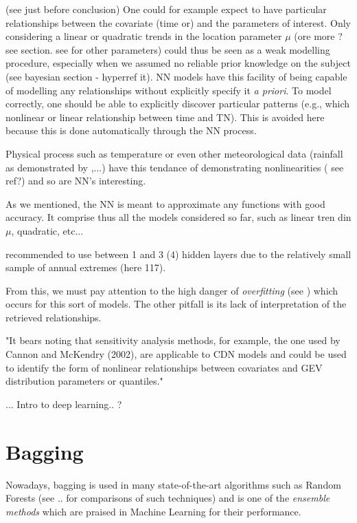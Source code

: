 \documentclass[11pt,a4paper,openany ]{book}
\begin{document}
(see \citet{cannon_flexible_2010} just before conclusion) 
One could for example expect to have particular relationships between the covariate (time or) and the parameters of interest. Only considering a linear or quadratic trends in the location parameter $\mu$ (ore more ? see section. see for other parameters) could thus be seen as a weak modelling procedure, especially when we assumed no reliable prior knowledge on the subject (see bayesian section - hyperref it).
NN models have this facility of being capable of modelling any relationships without explicitly specify it \emph{a priori}. To model correctly, one should be able to explicitly discover particular patterns (e.g., which nonlinear or linear relationship between time and TN). This is avoided here because this is done automatically through the NN process.

Physical process such as temperature or even other meteorological data (rainfall as demonstrated by \citet{cannon_flexible_2010},...) have this tendance of demonstrating nonlinearities ( see ref?) and so are NN's interesting.

As we mentioned, the NN is meant to approximate any functions with good accuracy. It comprise thus all the models considered so far, such as linear tren din $\mu$, quadratic, etc...

\citet{cannon_flexible_2010} recommended to use between 1 and 3 (4) hidden layers due to the relatively small sample of annual extremes (here 117).


 From this, we must pay attention to the high danger of \emph{overfitting} (see ) which occurs for this sort of models. The other pitfall is its lack of interpretation of the retrieved relationships.
 
 "It bears noting that sensitivity analysis methods,
 for example, the one used by Cannon and McKendry
 (2002), are applicable to CDN models and could be used
 to identify the form of nonlinear relationships between
 covariates and GEV distribution parameters or quantiles."
 
 ... Intro to deep learning.. ?
 
\section{Bagging} 

Nowadays, bagging is used in 
many state-of-the-art algorithms such as Random Forests (see .. for comparisons of such techniques) and is one of the \emph{ensemble methods} which are praised in Machine Learning for their performance.  
\end{document}
